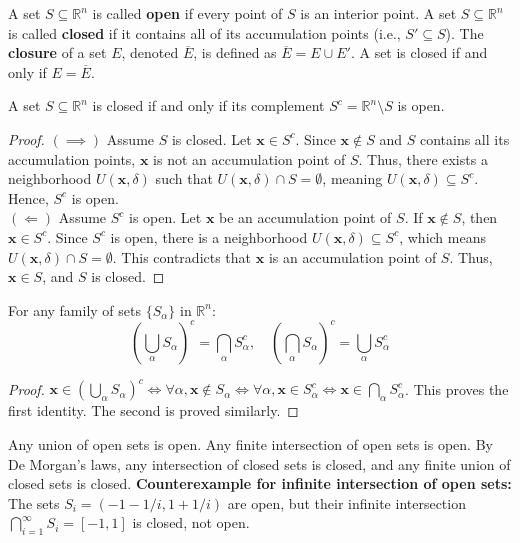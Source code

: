 \begin{definition}
A set $S \subseteq \mathbb{R}^n$ is called \textbf{open} if every point of $S$ is an interior point.
A set $S \subseteq \mathbb{R}^n$ is called \textbf{closed} if it contains all of its accumulation points (i.e., $S' \subseteq S$).
The \textbf{closure} of a set $E$, denoted $\overline{E}$, is defined as $\overline{E} = E \cup E'$. A set is closed if and only if $E = \overline{E}$.
\end{definition}

\begin{theorem}
A set $S \subseteq \mathbb{R}^n$ is closed if and only if its complement $S^c = \mathbb{R}^n \setminus S$ is open.
\end{theorem}
\begin{proof}
$(\implies)$ Assume $S$ is closed. Let $\mathbf{x} \in S^c$. Since $\mathbf{x} \notin S$ and $S$ contains all its accumulation points, $\mathbf{x}$ is not an accumulation point of $S$. Thus, there exists a neighborhood $U(\mathbf{x}, \delta)$ such that $U(\mathbf{x}, \delta) \cap S = \emptyset$, meaning $U(\mathbf{x}, \delta) \subseteq S^c$. Hence, $S^c$ is open. \\
$(\Longleftarrow)$ Assume $S^c$ is open. Let $\mathbf{x}$ be an accumulation point of $S$. If $\mathbf{x} \notin S$, then $\mathbf{x} \in S^c$. Since $S^c$ is open, there is a neighborhood $U(\mathbf{x}, \delta) \subseteq S^c$, which means $U(\mathbf{x}, \delta) \cap S = \emptyset$. This contradicts that $\mathbf{x}$ is an accumulation point of $S$. Thus, $\mathbf{x} \in S$, and $S$ is closed.
\end{proof}

\begin{theorem}
For any family of sets $\{S_\alpha\}$ in $\mathbb{R}^n$:
\[ \left( \bigcup_\alpha S_\alpha \right)^c = \bigcap_\alpha S_\alpha^c, \quad \left( \bigcap_\alpha S_\alpha \right)^c = \bigcup_\alpha S_\alpha^c \]
\end{theorem}
\begin{proof}
$\mathbf{x} \in (\bigcup_\alpha S_\alpha)^c \iff \forall \alpha, \mathbf{x} \notin S_\alpha \iff \forall \alpha, \mathbf{x} \in S_\alpha^c \iff \mathbf{x} \in \bigcap_\alpha S_\alpha^c$. This proves the first identity. The second is proved similarly.
\end{proof}

\begin{property}
Any union of open sets is open. Any finite intersection of open sets is open.
By De Morgan's laws, any intersection of closed sets is closed, and any finite union of closed sets is closed.
\textbf{Counterexample for infinite intersection of open sets:} The sets $S_i = (-1 - 1/i, 1 + 1/i)$ are open, but their infinite intersection $\bigcap_{i=1}^{\infty} S_i = [-1, 1]$ is closed, not open.
\end{property}

